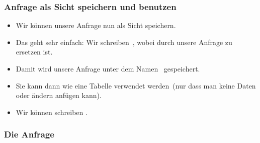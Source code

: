 \documentclass[aspectratio=169,mathserif,notheorems]{beamer}%
\begin{document}
%
%
\begin{frame}%
\frametitle{Anfrage als Sicht speichern und benutzen}%
\begin{itemize}%
\item Wir können unsere Anfrage nun als Sicht speichern.%
\item<2-> Das geht sehr einfach: Wir schreiben~, wobei  durch unsere Anfrage zu ersetzen ist.
\item<3-> Damit wird unsere Anfrage unter dem Namen~ gespeichert.%
\item<4-> Sie kann dann wie eine Tabelle verwendet werden~(nur dass man keine Daten oder ändern anfügen kann).%
\item<5-> Wir können schreiben .%
\end{itemize}%
\end{frame}%
%
\begin{frame}[t]
\frametitle{Die Anfrage}%
%
\end{frame}
%
\end{document}
